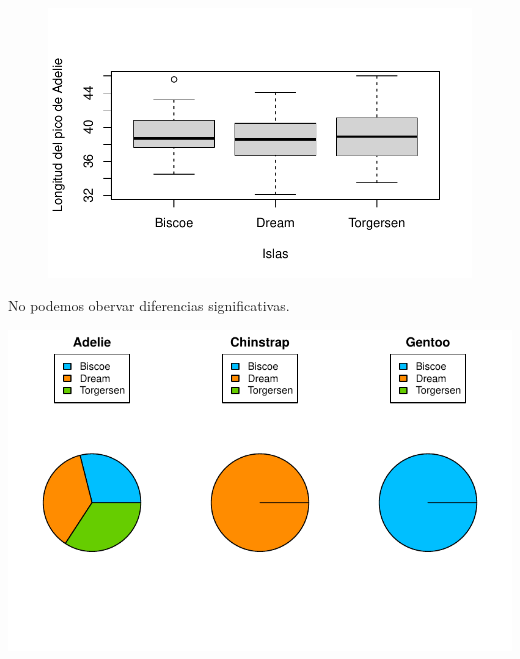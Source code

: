 \documentclass[
  letterpaper,
  DIV=11,
  numbers=noendperiod]{scrartcl}
\begin{document}
\begin{figure}[H]

{\centering \includegraphics{Entrega1_files/figure-pdf/unnamed-chunk-30-1.pdf}

}

\end{figure}

No podemos obervar diferencias significativas.

\includegraphics{Entrega1_files/figure-pdf/unnamed-chunk-32-1.pdf}
\end{document}
